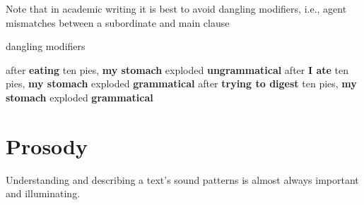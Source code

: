 \documentclass[12pt]{article}
\begin{document}
Note that in academic writing it is best to avoid dangling modifiers, i.e., agent mismatches between a subordinate and main clause
\begin{exe}
\ex dangling modifiers
    \begin{xlist}
    \ex after \textbf{eating} ten pies, \textbf{my stomach} exploded \hfill \textbf{ungrammatical}
    \ex after \textbf{I ate} ten pies, \textbf{my stomach} exploded \hfill \textbf{grammatical}
    \ex after \textbf{trying to digest} ten pies, \textbf{my stomach} exploded \hfill \textbf{grammatical}
    \end{xlist}
\end{exe}

\section{Prosody}

Understanding and describing a text's sound patterns is almost always important and illuminating.
\end{document}
